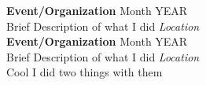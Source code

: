 %

\noindent \textbf{Event/Organization} \hfill Month YEAR \\
Brief Description of what I did \hfill \textit{Location} \\

\noindent \textbf{Event/Organization} \hfill Month YEAR \\
Brief Description of what I did \hfill \textit{Location} \\
Cool I did two things with them \\
